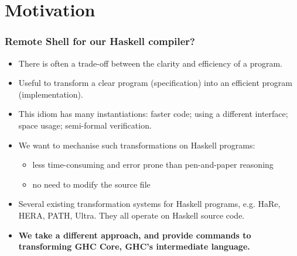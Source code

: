 \section{Motivation}

\begin{frame}
\frametitle{Remote Shell for our Haskell compiler?}

\begin{itemize}
\item
There is often a trade-off between the \alert{clarity} and \alert{efficiency} of a program.

\item
Useful to \alert{transform} a clear program (specification) into an efficient program (implementation). 

\item 
This idiom has many instantiations: 
 faster code; 
 using a different interface; 
 space usage;
 semi-formal verification.

\item
We want to \alert{mechanise} such transformations on Haskell programs:
  \begin{itemize}
     \item less time-consuming and error prone than pen-and-paper reasoning
     \item no need to modify the source file
  \end{itemize}

\item
Several existing transformation systems for Haskell programs, e.g. HaRe, HERA, PATH, Ultra.
They all operate on Haskell source code.

\item 
{\bf We take a different approach, and provide commands to transforming \alert{GHC Core}, GHC's intermediate language.}

\end{itemize}

\end{frame}
